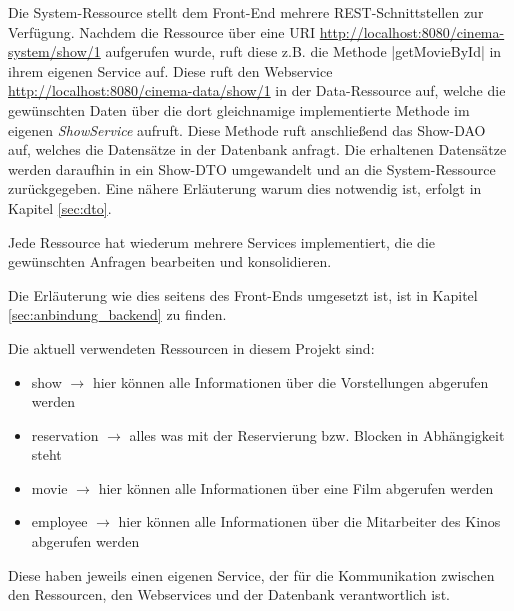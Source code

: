 Die System-Ressource stellt dem Front-End mehrere \acs{REST}-Schnittstellen zur Verfügung.
Nachdem die Ressource über eine \acs{URI} \url{http://localhost:8080/cinema-system/show/1} aufgerufen wurde, ruft diese z.B. die Methode \jinline |getMovieById| in ihrem eigenen Service auf.
Diese ruft den Webservice \url{http://localhost:8080/cinema-data/show/1} in der Data-Ressource auf, welche die gewünschten Daten über die dort gleichnamige implementierte Methode im eigenen \textit{ShowService} aufruft.
Diese Methode ruft anschließend das Show-\acs{DAO} auf, welches die Datensätze in der Datenbank anfragt.
Die erhaltenen Datensätze werden daraufhin in ein Show-\acf{DTO} umgewandelt und an die System-Ressource zurückgegeben.
Eine nähere Erläuterung warum dies notwendig ist, erfolgt in Kapitel \vref{sec:dto}.

Jede Ressource hat wiederum mehrere Services implementiert, die die gewünschten Anfragen bearbeiten und konsolidieren.

Die Erläuterung wie dies seitens des Front-Ends umgesetzt ist, ist in Kapitel \vref{sec:anbindung_backend} zu finden.


Die aktuell verwendeten Ressourcen in diesem Projekt sind:
\begin{itemize}
	\item show $\rightarrow$ hier können alle Informationen über die Vorstellungen abgerufen werden
	\item reservation $\rightarrow$ alles was mit der Reservierung bzw. Blocken in Abhängigkeit steht
	\item movie $\rightarrow$ hier können alle Informationen über eine Film abgerufen werden
	\item employee $\rightarrow$ hier können alle Informationen über die Mitarbeiter des Kinos abgerufen werden
\end{itemize}

Diese haben jeweils einen eigenen Service, der für die Kommunikation zwischen den Ressourcen, den Webservices und der Datenbank verantwortlich ist.